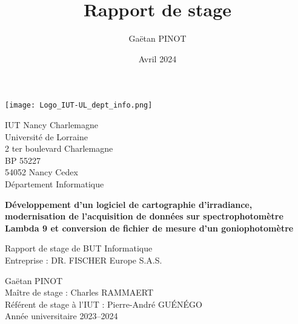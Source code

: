 \documentclass[12pt]{article}
\title{\Large\textbf{Rapport de stage}}
\author{Gaëtan PINOT}
\date{Avril 2024}
\begin{document}

\begin{center}
	\texttt{[image: Logo\_IUT-UL\_dept\_info.png]}
\end{center}

\vspace{1cm}

\noindent
{\large
IUT Nancy Charlemagne\\
Université de Lorraine\\
2 ter boulevard Charlemagne\\
BP 55227\\
54052 Nancy Cedex\\[5mm]
Département Informatique
}

\vspace{5cm}

\begin{center}
	{\huge
	\textbf{Développement d'un logiciel de cartographie d'irradiance, modernisation de l'acquisition de données sur spectrophotomètre Lambda 9 et conversion de fichier de mesure d'un goniophotomètre}
	}
	
\end{center}

\vspace{5cm}

{\Large
\noindent
Rapport de stage de BUT Informatique\\
Entreprise : DR. FISCHER Europe S.A.S.
}

\vfill

{\Large
\noindent
Gaëtan PINOT\\
Maître de stage : Charles RAMMAERT\\
Référent de stage à l'IUT : Pierre-André GUÉNÉGO\\
Année universitaire 2023--2024
}
\end{document}
